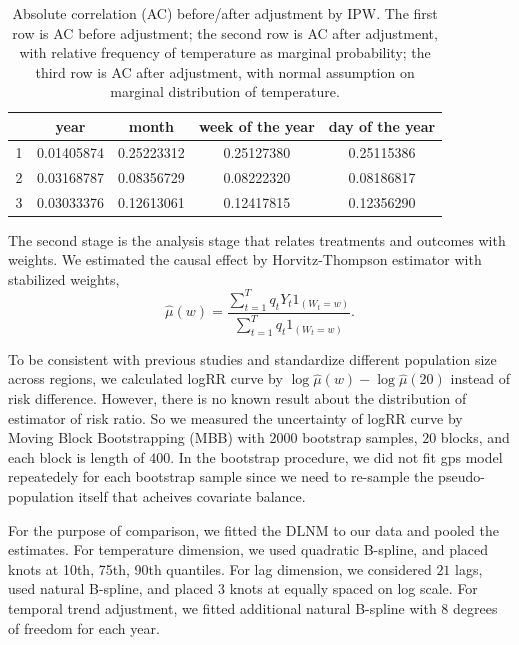 \documentclass[12pt]{article}
\begin{document}
\begin{table}[ht]
	\centering
\begin{tabular}{|| c || c | c | c | c || }
	\hline\hline
	\ & year & month & week of the year & day of the year \\
	\hline
	1 & 0.01405874 & 0.25223312 & 0.25127380 & 0.25115386 \\ %
	\hline
	2 & 0.03168787 & 0.08356729 & 0.08222320 & 0.08186817 \\ %
	\hline
	3 & 0.03033376 & 0.12613061 & 0.12417815 & 0.12356290 \\ %
	\hline\hline
	
\end{tabular}
\caption{
	Absolute correlation (AC) before/after adjustment by IPW.
	The first row is AC before adjustment;
	the second row is AC after adjustment, 
	with relative frequency of temperature as marginal probability;
	the third row is AC after adjustment, 
	with normal assumption on marginal distribution of temperature.}
\label{table:AC}
\end{table}

The second stage is the analysis stage that relates treatments and outcomes with weights.
We estimated the causal effect by Horvitz-Thompson estimator with stabilized weights,
\[
	\hat{\mu}(w) = \frac{\sum_{t = 1}^T q_t Y_t 1_{(W_t = w)}}{\sum_{t = 1}^T q_t 1_{(W_t = w)}}.
\]

To be consistent with previous studies and standardize different population size across regions,
we calculated logRR curve by $\log\hat{\mu}(w) - \log \hat{\mu}(20)$ instead of risk difference.
However, there is no known result about the distribution of estimator of risk ratio.
So we measured the uncertainty of logRR curve by Moving Block Bootstrapping (MBB)\cite{mbb1989}
with $2000$ bootstrap samples, $20$ blocks, and each block is length of $400$.
In the bootstrap procedure, we did not fit gps model repeatedely for each bootstrap sample
since we need to re-sample the pseudo-population itself that acheives covariate balance.

For the purpose of comparison, we fitted the DLNM to our data and pooled the estimates.
For temperature dimension, 
we used quadratic B-spline, and placed knots at 10th, 75th, 90th quantiles.
For lag dimension,
we considered $21$ lags, used natural B-spline, and placed $3$ knots at equally spaced on log scale.
For temporal trend adjustment,
we fitted additional natural B-spline with $8$ degrees of freedom for each year.
\end{document}
